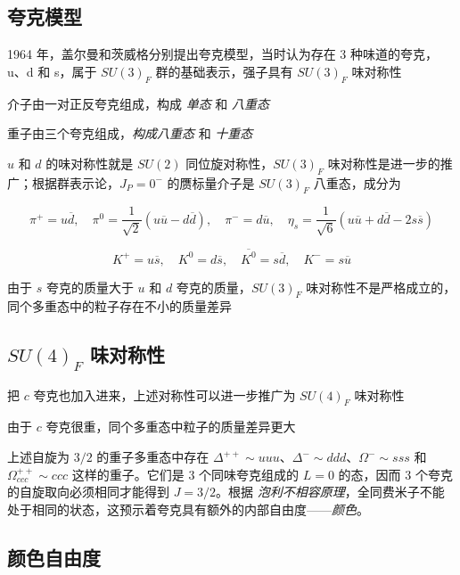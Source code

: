 \documentclass[oneside,a4paper,openany,11pt]{ctexbook}
\begin{document}
\subsection{夸克模型}

1964 年，盖尔曼和茨威格分别提出夸克模型，当时认为存在 3 种味道的夸克，u、d 和 s，属于 $SU(3)_F$ 群的基础表示，强子具有 $SU(3)_F$ 味对称性

介子由一对正反夸克组成，构成 \emph{单态} 和 \emph{八重态}

重子由三个夸克组成，\emph{构成八重态} 和 \emph{十重态}

$u$ 和 $d$ 的味对称性就是 $SU(2)$ 同位旋对称性，$SU(3)_F$ 味对称性是进一步的推广；根据群表示论，$J_P = 0^-$ 的赝标量介子是 $SU(3)_F$ 八重态，成分为

\begin{equation}
    \pi^+ = u\overline{d}, \quad \pi^0 = \frac{1}{\sqrt{2}} (u\overline{u}-d\overline{d}), \quad \pi^- = d\overline{u}, \quad \eta_s = \frac{1}{\sqrt{6}} (u\overline{u}+d\overline{d}-2s\overline{s})
\end{equation}

\begin{equation}
    K^+ = u\overline{s}, \quad K^0 = d\overline{s}, \quad \overline{K^0} = s\overline{d}, \quad K^- = s\overline{u}
\end{equation}

由于 $s$ 夸克的质量大于 $u$ 和 $d$ 夸克的质量，$SU(3)_F$ 味对称性不是严格成立的，同个多重态中的粒子存在不小的质量差异

\subsection{$SU(4)_F$ 味对称性}

把 $c$ 夸克也加入进来，上述对称性可以进一步推广为 $SU(4)_F$ 味对称性

由于 $c$ 夸克很重，同个多重态中粒子的质量差异更大

上述自旋为 $3/2$ 的重子多重态中存在 $\Delta^{++} \sim uuu$、$\Delta^- \sim ddd$、$\Omega^- \sim sss$ 和 $\Omega^{++}_{ccc} \sim ccc$ 这样的重子。它们是 $3$ 个同味夸克组成的 $L=0$ 的态，因而 $3$ 个夸克的自旋取向必须相同才能得到 $J=3/2$。根据 \emph{泡利不相容原理}，全同费米子不能处于相同的状态，这预示着夸克具有额外的内部自由度——\emph{颜色}。

\subsection{颜色自由度}
\end{document}
